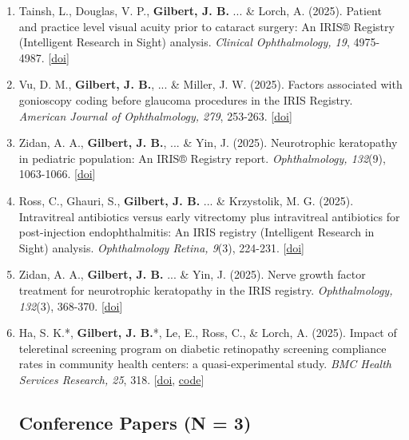 \documentclass[11pt]{article}
\begin{document}
\begin{enumerate}
\item Tainsh, L., Douglas, V. P., \textbf{Gilbert, J. B.} ... \& Lorch, A. (2025). Patient and practice level visual acuity prior to cataract surgery: An IRIS® Registry (Intelligent Research in Sight) analysis. \textit{Clinical Ophthalmology, 19}, 4975-4987. [\href{https://www.dovepress.com/articles.php?article_id=110610}{doi}]
\item Vu, D. M., \textbf{Gilbert, J. B.}, ... \& Miller, J. W. (2025). Factors associated with gonioscopy coding before glaucoma procedures in the IRIS Registry. \textit{American Journal of Ophthalmology, 279}, 253-263. [\href{https://doi.org/10.1016/j.ajo.2025.08.001}{doi}]
\item Zidan, A. A., \textbf{Gilbert, J. B.}, ... \& Yin, J. (2025). Neurotrophic keratopathy in pediatric population: An IRIS® Registry report. \textit{Ophthalmology, 132}(9), 1063-1066. [\href{https://doi.org/10.1016/j.ophtha.2025.04.020}{doi}]
\item Ross, C., Ghauri, S., \textbf{Gilbert, J. B.} ... \& Krzystolik, M. G. (2025). Intravitreal antibiotics versus early vitrectomy plus intravitreal antibiotics for post-injection endophthalmitis: An IRIS registry (Intelligent Research in Sight) analysis. \textit{Ophthalmology Retina, 9}(3), 224-231. [\href{https://doi.org/10.1016/j.oret.2024.09.002}{doi}] \label{vitrectomy}
\item Zidan, A. A., \textbf{Gilbert, J. B.} ... \& Yin, J. (2025). Nerve growth factor treatment for neurotrophic keratopathy in the IRIS registry. \textit{Ophthalmology, 132}(3), 368-370. [\href{https://doi.org/10.1016/j.ophtha.2024.10.036}{doi}]
\item Ha, S. K.*, \textbf{Gilbert, J. B.}*, Le, E., Ross, C., \& Lorch, A. (2025). Impact of teleretinal screening program on diabetic retinopathy screening compliance rates in community health centers: a quasi-experimental study. \textit{BMC Health Services Research, 25}, 318. [\href{https://doi.org/10.1186/s12913-025-12472-8}{doi}, \href{https://dataverse.harvard.edu/dataset.xhtml?persistentId=doi:10.7910/DVN/T5HXUE}{code}] \label{dr_comp}

\subsection{Conference Papers (N = 3)}


\end{enumerate}
\end{document}
